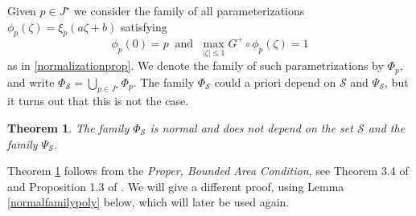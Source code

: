 \documentclass[10pt,a4paper]{article}
\newtheorem{theorem}{Theorem}[section]
\begin{document}
Given $p\in J^\star$ we consider the family of all parameterizations $\phi_p(\zeta)=\xi_p(a\zeta+b)$ satisfying
$$
\phi_p(0) = p \; \; \mathrm{and} \; \; \max_{|\zeta| \le 1} G^+ \circ \phi_p(\zeta) = 1
$$
as in \eqref{normalizationprop}. We denote the family of such parametrizations by $\Phi_p$, and write $\Phi_{\mathcal S}=\bigcup_{p\in J^\star}\Phi_p$. The family $\Phi_\mathcal S$ could a priori depend on $\mathcal S$ and $\Psi_\mathcal S$, but it turns out that this is not the case.

\begin{theorem}
\label{bignormalfamily}
The family $\Phi_\mathcal S$ is normal and does not depend on the set $\mathcal S$ and the family $\Psi_\mathcal S$.
\end{theorem}

Theorem \ref{bignormalfamily} follows from the \textit{Proper, Bounded Area Condition}, see Theorem 3.4 of \cite{BS8} and Proposition 1.3 of \cite{BSh}. We will give a different proof, using Lemma \ref{normalfamilypoly} below, which will later be used again.
\end{document}
